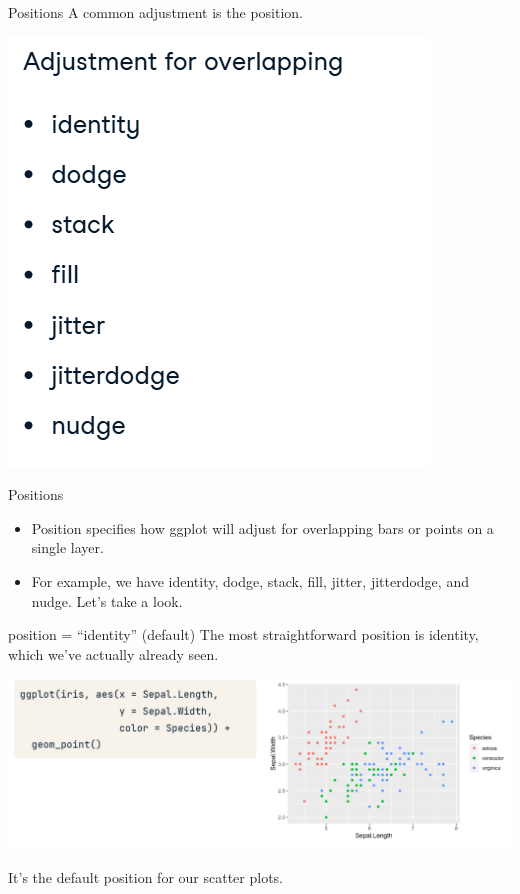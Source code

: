 \documentclass[
  ignorenonframetext,
]{beamer}
\begin{document}
\begin{frame}{Positions}
\label{positions}
A common adjustment is the position.

\includegraphics{../images/im152.png}
\end{frame}

\begin{frame}{Positions}
\label{positions-1}
\begin{itemize}
\item
  Position specifies how ggplot will adjust for overlapping bars or
  points on a single layer.
\item
  For example, we have identity, dodge, stack, fill, jitter,
  jitterdodge, and nudge. Let's take a look.
\end{itemize}
\end{frame}

\begin{frame}{position = ``identity'' (default)}
\label{position-identity-default}
The most straightforward position is identity, which we've actually
already seen.

\includegraphics{../images/im153.png}

It's the default position for our scatter plots.
\end{frame}
\end{document}

